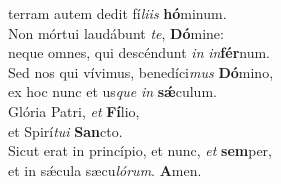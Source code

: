 \oddverse terram autem dedit fí\textit{li}\textit{is} \textbf{hó}minum.\\
\evenverse Non mórtui laudábunt \textit{te}, \textbf{Dó}mine:~\*\\
\evenverse neque omnes, qui descéndunt \textit{in} \textit{in}\textbf{fér}num.\\
\oddverse Sed nos qui vívimus, benedíci\textit{mus} \textbf{Dó}mino,~\*\\
\oddverse ex hoc nunc et us\textit{que} \textit{in} \textbf{sǽ}culum.\\
\evenverse Glória Patri, \textit{et} \textbf{Fí}lio,~\*\\
\evenverse et Spirí\textit{tu}\textit{i} \textbf{San}cto.\\
\oddverse Sicut erat in princípio, et nunc, \textit{et} \textbf{sem}per,~\*\\
\oddverse et in sǽcula sæcu\textit{ló}\textit{rum}. \textbf{A}men.\\
